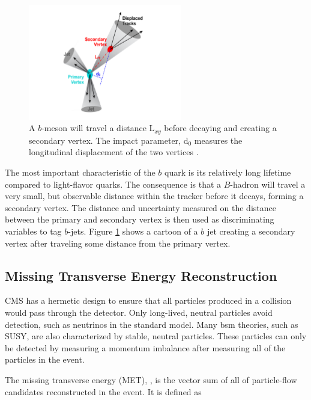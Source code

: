\begin{figure}[h]
   \centering
  \includegraphics[width=0.6\textwidth]{Figures/Reconstruction_Diagrams/Jets__bTagging.pdf}
  \caption{A $b$-meson will travel a distance L$_{xy}$ before decaying
  and creating a secondary vertex.  The impact parameter, d$_{0}$
  measures the longitudinal displacement of the two vertices
  \cite{CMS:BTaggingCartoon}. } \label{fig:bTagging}
\end{figure}

\par The most important characteristic of the $b$ quark is its
relatively long lifetime compared to light-flavor quarks.  The
consequence is that a $B$-hadron will travel a very small, but
observable distance within the tracker before it decays, forming a
secondary vertex.  The distance and uncertainty measured on the
distance between the primary and secondary vertex is then used as
discriminating variables to tag $b$-jets.  Figure \ref{fig:bTagging}
shows a cartoon of a $b$ jet creating a secondary vertex after
traveling some distance from the primary vertex.   

\subsection{Missing Transverse Energy Reconstruction}

\par CMS has a hermetic design to ensure that all particles produced
in a collision would pass through the detector.  Only long-lived,
neutral particles avoid detection, such as neutrinos in the standard
model.  Many \acrshort{bsm} theories, such as SUSY, are also
characterized by stable, neutral particles.  These particles can only
be detected by measuring a momentum imbalance after measuring all of
the particles in the event.

\par The missing transverse energy (MET), \ETslash, is the vector sum of
all of particle-flow candidates reconstructed in the event.  It is
defined as 

